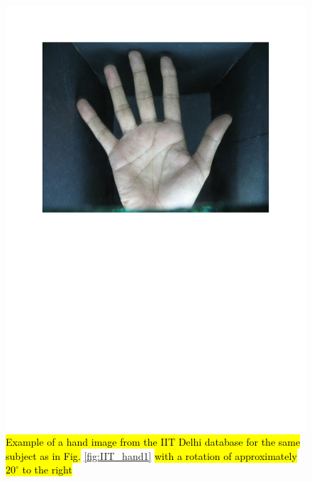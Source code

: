 \documentclass[review]{elsarticle}
\begin{document}
		\begin{figure}[!h]
		    \centering
		    \includegraphics[page=4,scale=.57,trim=1cm 14.7cm 1cm 1.7cm,clip]{IIT_samples.pdf}
		    \caption{\hl{Example of a hand image from the IIT Delhi database for the same subject as in Fig.} \ref{fig:IIT_hand1} \hl{with a rotation of approximately $20^{\circ}$ to the right}}
		    \label{fig:IIT_hand3}
		\end{figure}
\end{document}
